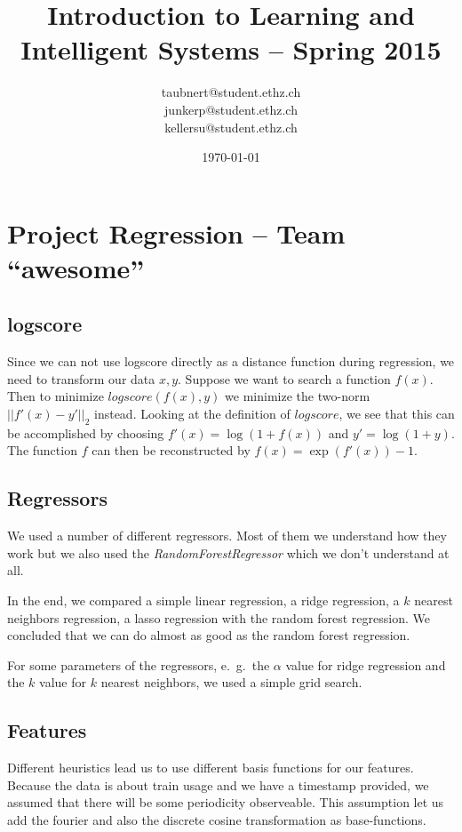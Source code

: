 \documentclass[a4paper, 11pt]{article}
\title{Introduction to Learning and Intelligent Systems -- Spring 2015}
\author{taubnert@student.ethz.ch\\ junkerp@student.ethz.ch\\ kellersu@student.ethz.ch\\}
\date{\today}
\begin{document}
\maketitle

\section{Project Regression -- Team ``awesome''}



\subsection{logscore}
Since we can not use logscore directly as a distance function during regression,
we need to transform our data $x,y$.
Suppose we want to search a function $f(x)$.
Then to minimize $logscore(f(x),y)$ we minimize the two-norm $||f'(x) - y'||_2$ instead.
Looking at the definition of $logscore$, we see that this can be accomplished by choosing $f'(x) = \log(1 + f(x))$ and $y' = \log(1 + y)$.
The function $f$ can then be reconstructed by $f(x) = \exp(f'(x)) - 1$.

\subsection{Regressors}
We used a number of different regressors.
Most of them we understand how they work but we also used the \emph{RandomForestRegressor} which we don't understand at all.

In the end, we compared a simple linear regression, a ridge regression, a $k$ nearest neighbors regression, a lasso regression with the random forest regression.
We concluded that we can do almost as good as the random forest regression.

For some parameters of the regressors, e.\ g.\ the $\alpha$ value for ridge regression and the $k$ value for $k$ nearest neighbors,
we used a simple grid search.

\subsection{Features}
Different heuristics lead us to use different basis functions for our features.
Because the data is about train usage and we have a timestamp provided, we assumed that there will be some periodicity observeable.
This assumption let us add the fourier and also the discrete cosine transformation as base-functions.
\end{document}
